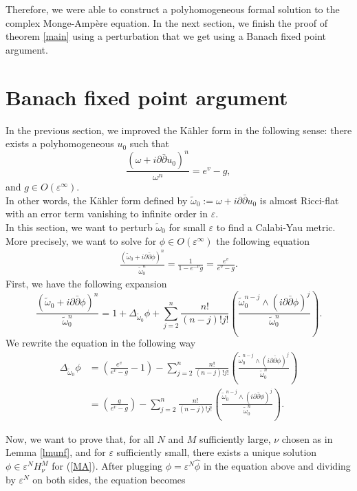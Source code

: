 \documentclass[a4paper,11pt]{article}
\begin{document}
Therefore, we were able to construct a polyhomogeneous formal solution to the complex Monge-Ampère equation. In the next section, we finish the proof of theorem \ref{main} using a perturbation that we get using a Banach fixed point argument.
\section{Banach fixed point argument} \label{secfix}
In the previous section, we improved the Kähler form in the following sense: there exists a polyhomogeneous $u_{0}$ such that 
$$
\frac{\left(\omega + i \partial \bar{\partial} u_{0}\right)^n}{\omega^n} = e^v-g,
$$
and $g \in O( \varepsilon^{\infty})$.\\ In other words, the Kähler form defined by $\tilde \omega_{0} := \omega + i \partial \bar{\partial} u_{0}$ is almost Ricci-flat with an error term vanishing to infinite order in $\varepsilon$.\\

In this section, we want to perturb $\tilde \omega_0$ for small $\varepsilon$ to find a Calabi-Yau metric. More precisely, we want to solve for $\phi \in O(\varepsilon^{\infty})$ the following equation 
\begin{align} \label{MA8}
\frac{\left(\tilde \omega_0 + i \partial \bar{\partial} \phi\right)^n}{\tilde \omega_0^n} = \frac{1}{1 - e^{-v} g} = \frac{e^{v}}{e^{v} - g}.
\end{align}
First, we have the following expansion 
$$
\frac{\left(\tilde \omega_0+i \partial \bar{\partial} \phi\right)^n}{\tilde \omega_0^n} = 1+\Delta_{\tilde \omega_0} \phi+\sum_{j=2}^n \frac{n!}{(n-j)!j!}\left(\frac{\tilde \omega_0^{n-j} \wedge(i \partial \bar{\partial} \phi)^j}{\tilde \omega_0^n}\right).
$$
We rewrite the equation in the following way
\begin{align*}
\Delta_{\tilde \omega_0} \phi & = \left( \frac{e^{v}}{e^{v} - g} - 1 \right) -  \sum_{j=2}^n \frac{n!}{(n-j)!j!}\left(\frac{\tilde \omega_0^{n-j} \wedge(i \partial \bar{\partial} \phi)^j}{\tilde \omega_0^n} \right) \\ & = \left( \frac{g}{e^{v} - g} \right) -  \sum_{j=2}^n \frac{n!}{(n-j)!j!}\left(\frac{\tilde \omega_0^{n-j} \wedge(i \partial \bar{\partial} \phi)^j}{\tilde \omega_0^n} \right).
\end{align*}


Now, we want to prove that, for all $N$ and $M$ sufficiently large, $\nu$ chosen as in Lemma \ref{lmunf}, and for $\varepsilon$ sufficiently small, there exists a unique solution $\phi \in \varepsilon^N H_{\nu}^M$ for (\ref{MA}). After plugging $\phi = \varepsilon^N \hat \phi$ in the equation above and dividing by $\varepsilon^N$ on both sides, the equation becomes 
\end{document}
